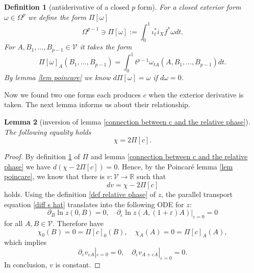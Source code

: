 \documentclass[b5paper,draft,openbib,12pt]{memoir}
\newtheorem{Def}{Definition}
\newtheorem{Lemma}[Def]{Lemma}
\begin{document}
\begin{Def}[antiderivative of a closed \(p\) form]\label{antiderivative}
For a closed exterior form \(\omega\in\Omega^{p}\) we define the form \(\Pi [\omega]\)
\begin{equation}
\Omega^{p-1}\ni\Pi\![\omega]:=\int_{0}^1 \iota^*_t i_X f^* \omega dt.
\end{equation}
For \(A,B_1,\dots , B_{p-1}\in\mathcal{V}\) it takes the form 
\begin{equation}
\Pi\![\omega]_A(B_1,\dots, B_{p-1})=\int_0^1 t^{p-1} \omega_{tA}(A,B_1,\dots, B_{p-1})dt.
\end{equation}
By lemma \ref{lem poincare} we know \(d\Pi [\omega]=\omega\) if \(d\omega=0\).
\end{Def}

Now we found two one forms each produces \(c\) when the exterior derivative is taken. The next lemma informs us about their relationship.

\begin{Lemma}[inversion of lemma \ref{connection between c and the relative phase}]
The following equality holds
\begin{equation}
\chi=2 \Pi\![c].
\end{equation}
\end{Lemma}
\begin{proof}
By definition \ref{antiderivative} of \(\Pi\) and 
lemma \ref{connection between c and the relative phase}
we have \(d(\chi-2 \Pi\![c])=0\). Hence, 
by the Poincaré lemma 
\ref{lem poincare}, we know that there is 
\(v:\mathcal{V}\rightarrow \mathbb{R}\) such that
\begin{equation}
dv=\chi-2 \Pi\![c]
\end{equation}%
holds. Using the definition \ref{def relative phase} of \(z\), 
 the parallel transport equation \eqref{diff s hat} 
 translates into the 
following ODE for \(z\):
\begin{equation}
\partial_B \ln z(0,B)=0, \quad \partial_\varepsilon \ln z(A,(1+\varepsilon)A)|_{\varepsilon =0}=0
\end{equation}
for all \(A,B\in\mathcal{V}\). Therefore have
\begin{equation}
\chi_0(B)=0=\Pi\![c]_0(B), \quad \chi_{A}(A)=0=\Pi\![c]_A(A),
\end{equation}
which implies
\begin{equation}
\partial_\varepsilon v_{\varepsilon A}|_{\varepsilon=0}=0, 
\quad \partial_\varepsilon v_{A+\varepsilon A}|_{\varepsilon=0}=0.
\end{equation}
In conclusion, \(v\) is constant.
\end{proof}
\end{document}
